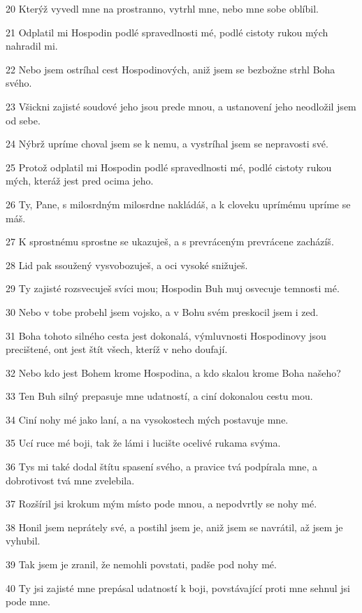 \par 20 Kterýž vyvedl mne na prostranno, vytrhl mne, nebo mne sobe oblíbil.
\par 21 Odplatil mi Hospodin podlé spravedlnosti mé, podlé cistoty rukou mých nahradil mi.
\par 22 Nebo jsem ostríhal cest Hospodinových, aniž jsem se bezbožne strhl Boha svého.
\par 23 Všickni zajisté soudové jeho jsou prede mnou, a ustanovení jeho neodložil jsem od sebe.
\par 24 Nýbrž upríme choval jsem se k nemu, a vystríhal jsem se nepravosti své.
\par 25 Protož odplatil mi Hospodin podlé spravedlnosti mé, podlé cistoty rukou mých, kteráž jest pred ocima jeho.
\par 26 Ty, Pane, s milosrdným milosrdne nakládáš, a k cloveku uprímému upríme se máš.
\par 27 K sprostnému sprostne se ukazuješ, a s prevráceným prevrácene zacházíš.
\par 28 Lid pak ssoužený vysvobozuješ, a oci vysoké snižuješ.
\par 29 Ty zajisté rozsvecuješ svíci mou; Hospodin Buh muj osvecuje temnosti mé.
\par 30 Nebo v tobe probehl jsem vojsko, a v Bohu svém preskocil jsem i zed.
\par 31 Boha tohoto silného cesta jest dokonalá, výmluvnosti Hospodinovy jsou precištené, ont jest štít všech, kteríž v neho doufají.
\par 32 Nebo kdo jest Bohem krome Hospodina, a kdo skalou krome Boha našeho?
\par 33 Ten Buh silný prepasuje mne udatností, a ciní dokonalou cestu mou.
\par 34 Ciní nohy mé jako laní, a na vysokostech mých postavuje mne.
\par 35 Ucí ruce mé boji, tak že lámi i lucište ocelivé rukama svýma.
\par 36 Tys mi také dodal štítu spasení svého, a pravice tvá podpírala mne, a dobrotivost tvá mne zvelebila.
\par 37 Rozšíril jsi krokum mým místo pode mnou, a nepodvrtly se nohy mé.
\par 38 Honil jsem neprátely své, a postihl jsem je, aniž jsem se navrátil, až jsem je vyhubil.
\par 39 Tak jsem je zranil, že nemohli povstati, padše pod nohy mé.
\par 40 Ty jsi zajisté mne prepásal udatností k boji, povstávající proti mne sehnul jsi pode mne.
